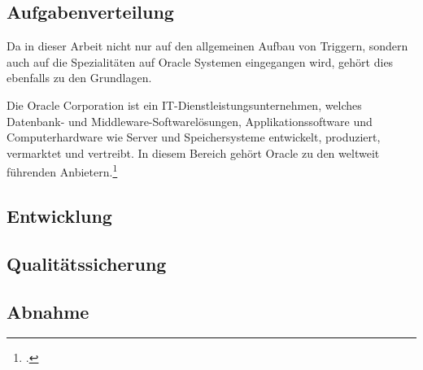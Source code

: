 \subsection{Aufgabenverteilung}
Da in dieser Arbeit nicht nur auf den allgemeinen Aufbau von Triggern, sondern auch auf die Spezialitäten auf Oracle Systemen eingegangen wird, gehört dies ebenfalls zu den Grundlagen.

Die Oracle Corporation ist ein IT-Dienstleistungsunternehmen, welches Datenbank- und Middleware-Softwarelösungen, Applikationssoftware und Computerhardware wie Server und Speichersysteme entwickelt, produziert, vermarktet und vertreibt. In diesem Bereich gehört Oracle zu den weltweit führenden Anbietern.\footcite[Vgl.][]{OracleCorp}

\subsection{Entwicklung}

\subsection{Qualitätssicherung}

\subsection{Abnahme}
